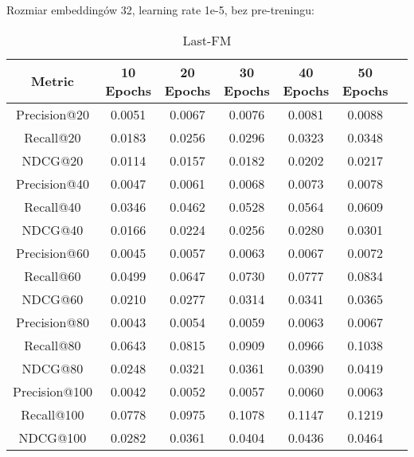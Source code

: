 \documentclass[a4paper,onecolumn]{LTJournalArticle}
\begin{document}
	Rozmiar embeddingów 32, learning rate 1e-5, bez pre-treningu:
	\begin{table}[h]
		\centering
		\caption{Last-FM}
		\label{tab:metrics_transposed}
		\scriptsize %
		\begin{tabular}{ccccccc}
			\toprule
			Metric & 10 Epochs & 20 Epochs & 30 Epochs & 40 Epochs & 50 Epochs \\
			\midrule
			Precision@20  & 0.0051  & 0.0067  & 0.0076  & 0.0081  & 0.0088  \\
			Recall@20     & 0.0183  & 0.0256  & 0.0296  & 0.0323  & 0.0348  \\
			NDCG@20       & 0.0114  & 0.0157  & 0.0182  & 0.0202  & 0.0217  \\
			Precision@40  & 0.0047  & 0.0061  & 0.0068  & 0.0073  & 0.0078  \\
			Recall@40     & 0.0346  & 0.0462  & 0.0528  & 0.0564  & 0.0609  \\
			NDCG@40       & 0.0166  & 0.0224  & 0.0256  & 0.0280  & 0.0301  \\
			Precision@60  & 0.0045  & 0.0057  & 0.0063  & 0.0067  & 0.0072  \\
			Recall@60     & 0.0499  & 0.0647  & 0.0730  & 0.0777  & 0.0834  \\
			NDCG@60       & 0.0210  & 0.0277  & 0.0314  & 0.0341  & 0.0365  \\
			Precision@80  & 0.0043  & 0.0054  & 0.0059  & 0.0063  & 0.0067  \\
			Recall@80     & 0.0643  & 0.0815  & 0.0909  & 0.0966  & 0.1038  \\
			NDCG@80       & 0.0248  & 0.0321  & 0.0361  & 0.0390  & 0.0419  \\
			Precision@100 & 0.0042  & 0.0052  & 0.0057  & 0.0060  & 0.0063  \\
			Recall@100    & 0.0778  & 0.0975  & 0.1078  & 0.1147  & 0.1219  \\
			NDCG@100      & 0.0282  & 0.0361  & 0.0404  & 0.0436  & 0.0464  \\
			\bottomrule
		\end{tabular}
	\end{table}
	
\end{document}
